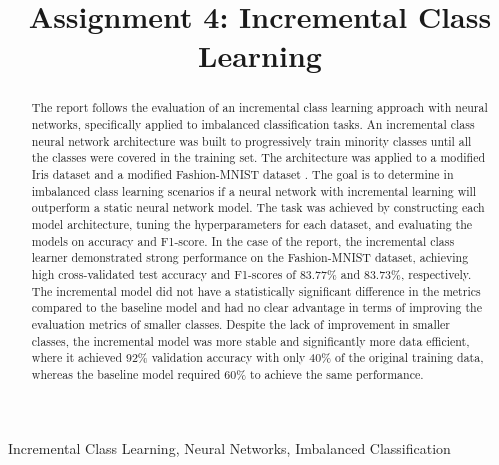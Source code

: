 \documentclass[conference]{IEEEtran}
\begin{document}
\title{Assignment 4: Incremental Class Learning}

\author{
}

\maketitle

\begin{abstract}
The report follows the evaluation of an incremental class learning approach with neural networks, specifically applied to imbalanced classification tasks. An incremental class neural network architecture 
was built to progressively train minority classes until all the classes were covered in the training set. The architecture was applied to a modified Iris dataset \cite{fisher1936iris} and a modified Fashion-MNIST dataset \cite{xiao2017fashionmnist}. 
The goal is to determine in imbalanced class learning scenarios if a neural network with incremental learning will outperform a static neural network model. The task was achieved by constructing each model architecture, tuning the hyperparameters for each dataset, and evaluating the models on accuracy and F1-score. 
In the case of the report, the incremental class learner demonstrated strong performance on the Fashion-MNIST dataset, achieving high cross-validated test accuracy and F1-scores of 83.77\% and 83.73\%, respectively. The incremental model did not have a statistically
significant difference in the metrics compared to the baseline model and had no clear advantage in terms of improving the evaluation metrics of smaller classes. Despite the lack of improvement in smaller classes, the incremental model was more stable and significantly more data efficient, where it 
achieved 92\% validation accuracy with only 40\% of the original training data, whereas the baseline model 
required 60\% to achieve the same performance.
\end{abstract}

\begin{IEEEkeywords}
Incremental Class Learning, Neural Networks, Imbalanced Classification
\end{IEEEkeywords}

\end{document}
